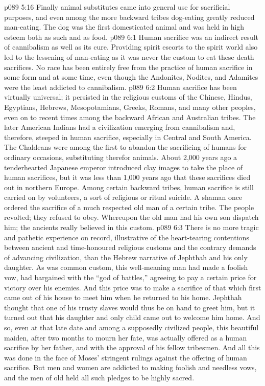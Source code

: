 \vs p089 5:16 \pc Finally animal substitutes came into general use for sacrificial purposes, and even among the more backward tribes dog\hyp{}eating greatly reduced man\hyp{}eating. The dog was the first domesticated animal and was held in high esteem both as such and as food.
\vs p089 6:1 Human sacrifice was an indirect result of cannibalism as well as its cure. Providing spirit escorts to the spirit world also led to the lessening of man\hyp{}eating as it was never the custom to eat these death sacrifices. No race has been entirely free from the practice of human sacrifice in some form and at some time, even though the Andonites, Nodites, and Adamites were the least addicted to cannibalism.
\vs p089 6:2 Human sacrifice has been virtually universal; it persisted in the religious customs of the Chinese, Hindus, Egyptians, Hebrews, Mesopotamians, Greeks, Romans, and many other peoples, even on to recent times among the backward African and Australian tribes. The later American Indians had a civilization emerging from cannibalism and, therefore, steeped in human sacrifice, especially in Central and South America. The Chaldeans were among the first to abandon the sacrificing of humans for ordinary occasions, substituting therefor animals. About 2,000 years ago a tenderhearted Japanese emperor introduced clay images to take the place of human sacrifices, but it was less than 1,000 years ago that these sacrifices died out in northern Europe. Among certain backward tribes, human sacrifice is still carried on by volunteers, a sort of religious or ritual suicide. A shaman once ordered the sacrifice of a much respected old man of a certain tribe. The people revolted; they refused to obey. Whereupon the old man had his own son dispatch him; the ancients really believed in this custom.
\vs p089 6:3 \pc There is no more tragic and pathetic experience on record, illustrative of the heart\hyp{}tearing contentions between ancient and time\hyp{}honoured religious customs and the contrary demands of advancing civilization, than the Hebrew narrative of Jephthah and his only daughter. As was common custom, this well\hyp{}meaning man had made a foolish vow, had bargained with the “god of battles,” agreeing to pay a certain price for victory over his enemies. And this price was to make a sacrifice of that which first came out of his house to meet him when he returned to his home. Jephthah thought that one of his trusty slaves would thus be on hand to greet him, but it turned out that his daughter and only child came out to welcome him home. And so, even at that late date and among a supposedly civilized people, this beautiful maiden, after two months to mourn her fate, was actually offered as a human sacrifice by her father, and with the approval of his fellow tribesmen. And all this was done in the face of Moses’ stringent rulings against the offering of human sacrifice. But men and women are addicted to making foolish and needless vows, and the men of old held all such pledges to be highly sacred.
